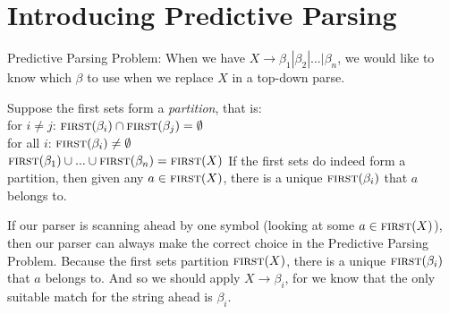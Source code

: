 \frmrule 

\frmrule 



\frmrule 

\begin{example}


\end{example}


\section{Introducing Predictive Parsing}



Predictive Parsing Problem:
When we have $X \rightarrow \beta_1 | \beta_2 | ... | \beta_n$, 
we would like to know which $\beta$ to use when we replace $X$ in a top-down parse.

Suppose the first sets form a \textit{partition}, that is: \\
for $i \neq j$: $\textsc{first}(\beta_i) \cap \textsc{first}(\beta_j) = \emptyset$ \\
for all $i$: $\textsc{first}(\beta_i) \neq \emptyset$ \\
$\textsc{first}(\beta_1) \cup ... \cup \textsc{first}(\beta_n) = \textsc{first}(X)$
If the first sets do indeed form a partition, then given 
any $a \in \textsc{first}(X)$, there is a unique $\textsc{first}(\beta_i)$ 
that $a$ belongs to. 

If our parser is scanning ahead by one symbol (looking at some $a \in \textsc{first}(X)$), 
then our parser can always make the correct choice 
in the Predictive Parsing Problem. 
Because the first sets partition $\textsc{first}(X)$, there is a unique $\textsc{first}(\beta_i)$ 
that $a$ belongs to. And so we should apply $X \rightarrow \beta_i$, for we know that 
the only suitable match for the string ahead is $\beta_i$. 



